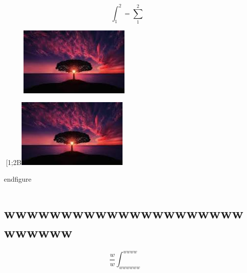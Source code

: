 \documentclass{beamer}
\begin{document}
\begin{equation}\label{key}
	\int_{1}^{2}=\sum_{1}^{2}
\end{equation}
\begin{figure}
	\centering
	\includegraphics[width=0.7\linewidth]{screenshot003}
	\caption{}
	\label{fig:screenshot003}
\end{figure}
\begin{frame}

\centering
[1;2B\includegraphics[width=0.3\linewidth]{screenshot002}
\caption{}
\label{fig:screenshot002}
end{figure}

\section{wwwwwwwwwwwwwwwwwwwwwwwwwww}
\begin{equation}
	\frac{w}{w}	\int_{wwwwww}^{wwww}
	\label{www}
\end{equation}

\end{frame}
\end{document}

